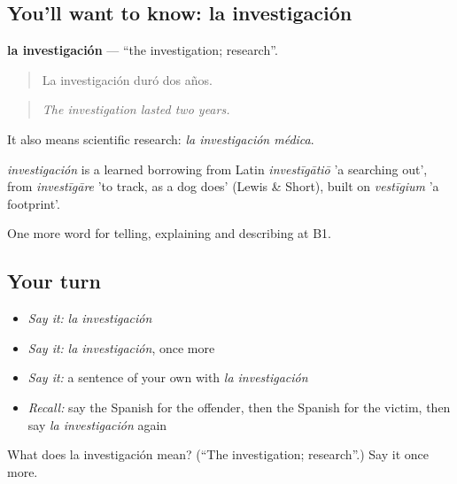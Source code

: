 \subsection*{You'll want to know: la investigación}
\textbf{la investigación} — \textquotedblleft{}the investigation; research\textquotedblright{}.

\begin{quote}
La investigación duró dos años.
\end{quote}

\begin{quote}
\emph{The investigation lasted two years.}
\end{quote}

It also means scientific research: \emph{la investigación médica}.

\begin{cousinweb}
\emph{investigación} is a learned borrowing from Latin \emph{investīgātiō} 'a searching out', from \emph{investīgāre} 'to track, as a dog does' (Lewis \& Short), built on \emph{vestīgium} 'a footprint'.
\end{cousinweb}

\begin{grammarlens}[title={What you've built}]
One more word for telling, explaining and describing at B1.
\end{grammarlens}

\subsection*{Your turn}
\begin{itemize}
\raggedright
  \item \emph{Say it:} \emph{la investigación}
  \item \emph{Say it:} \emph{la investigación}, once more
  \item \emph{Say it:} a sentence of your own with \emph{la investigación}
  \item \emph{Recall:} say the Spanish for the offender, then the Spanish for the victim, then say \emph{la investigación} again
\end{itemize}

\begin{tcolorbox}[breakable,colback=teal!4,colframe=teal!35!black,title={Before you move on}]
What does la investigación mean? (\textquotedblleft{}The investigation; research\textquotedblright{}.) Say it once more.
\end{tcolorbox}
